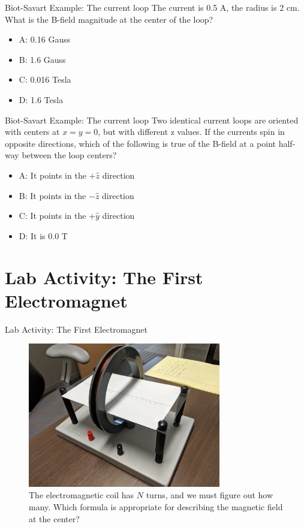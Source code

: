 \documentclass{beamer}
\begin{document}
\begin{frame}{Biot-Savart Example: The current loop}
The current is 0.5 A, the radius is 2 cm.  What is the B-field magnitude at the center of the loop?
\begin{itemize}
\item A: 0.16 Gauss
\item B: 1.6 Gauss
\item C: 0.016 Tesla
\item D: 1.6 Tesla
\end{itemize}
\end{frame}

\begin{frame}{Biot-Savart Example: The current loop}
Two identical current loops are oriented with centers at $x=y=0$, but with different z values.  If the currents spin in opposite directions, which of the following is true of the B-field at a point half-way between the loop centers?
\begin{itemize}
\item A: It points in the $+\hat{z}$ direction
\item B: It points in the $-\hat{z}$ direction
\item C: It points in the $+\hat{y}$ direction
\item D: It is 0.0 T
\end{itemize}
\end{frame}

\section{Lab Activity: The First Electromagnet}

\begin{frame}{Lab Activity: The First Electromagnet}
\begin{figure}
\centering
\includegraphics[width=0.75\textwidth]{figures/coil.jpg}
\caption{\label{fig:lab1coil} The electromagnetic coil has $N$ turns, and we must figure out how many.  Which formula is appropriate for describing the magnetic field at the center?}
\end{figure}
\end{frame}
\end{document}
